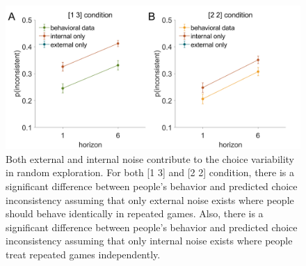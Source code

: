 \documentclass[12pt]{article}
\begin{document}
	\begin{figure}[H]
		\begin{center}
			\includegraphics[width=\textwidth]{figall/theory_da_info.png}
			\caption[Both external and internal noise contribute to the choice variability in random exploration]{Both external and internal noise contribute to the choice variability in random exploration. For both [1 3] and [2 2] condition, there is a significant difference between people's behavior and predicted choice inconsistency assuming that only external noise exists where people should behave identically in repeated games. Also, there is a significant difference between people's behavior and predicted choice inconsistency assuming that only internal noise exists where people treat repeated games independently. }
			\label{fig:mf22}
		\end{center}
	\end{figure}
	\newpage
\end{document}
